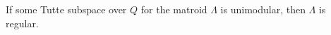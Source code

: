 If some Tutte subspace over $Q$ for the matroid $\Lambda$ is unimodular, then $\Lambda$ is regular.
